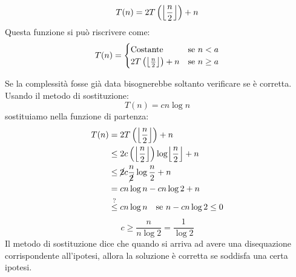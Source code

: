\documentclass[a4paper]{article}
\begin{document}
\begin{example}
  \[
    T(n) = 2T\left(\floor*{\frac{n}{2}}\right) + n
  \] 
  Questa funzione si può riscrivere come:
  \[
  T(n) = \begin{cases}
    \text{Costante} & \text{se } n < a \\
    2T\left(\floor*{\frac{n}{2}}\right) + n & \text{se } n \ge a
  \end{cases}
  \] 

  \vspace{1em}
  \noindent
  Se la complessità fosse già data bisognerebbe soltanto verificare se è corretta.
  Usando il metodo di sostituzione:
  \[
    T(n) = cn \log n
  \] 
  sostituiamo nella funzione di partenza:
  \[
    \begin{aligned}
      T(n)  & = 2T\left(\floor*{\frac{n}{2}}\right) + n\\
            & \le 2c\left(\floor*{\frac{n}{2}}\right) \log \floor*{\frac{n}{2}} + n\\
            & \le \cancel{2} c \frac{n}{\cancel{2}} \log \frac{n}{2} + n\\
            & = cn \log n - cn \log 2 + n\\
            & \stackrel{?}{\le} cn \log n \quad \text{se } n- cn \log 2 \le 0\\
    \end{aligned}
  \] 
  \[
    c \ge \frac{n}{n \log 2} = \frac{1}{\log 2}
  \] 
  Il metodo di sostituzione dice che quando si arriva ad avere una disequazione
  corrispondente all'ipotesi, allora la soluzione è corretta se soddisfa una certa ipotesi.
\end{example}
\end{document}
